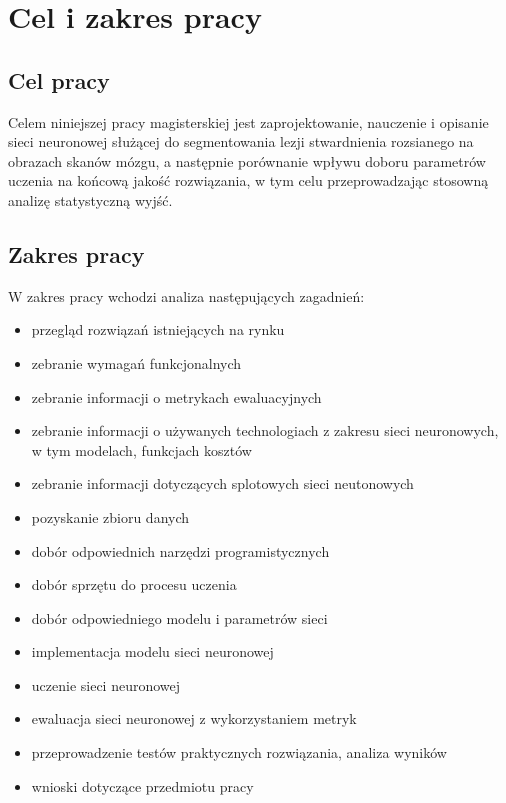 \section{Cel i zakres pracy}
\label{sec:PurposeAndScope}
\subsection{Cel pracy}
\label{sec:Purpose}
\par
Celem niniejszej pracy magisterskiej jest zaprojektowanie, nauczenie i opisanie sieci neuronowej służącej do segmentowania lezji stwardnienia rozsianego na obrazach skanów mózgu, a następnie porównanie wpływu doboru parametrów uczenia na końcową jakość rozwiązania, w tym celu przeprowadzając stosowną analizę statystyczną wyjść.       
\subsection{Zakres pracy}
\label{sec:Scope}
\par
W zakres pracy wchodzi analiza następujących zagadnień:
\begin{itemize}
    \item przegląd rozwiązań istniejących na rynku 
    \item zebranie wymagań funkcjonalnych 
    \item zebranie informacji o metrykach ewaluacyjnych 
    \item zebranie informacji o używanych technologiach z zakresu sieci neuronowych, w tym modelach, funkcjach kosztów 
    \item zebranie informacji dotyczących splotowych sieci neutonowych 
    \item pozyskanie zbioru danych 
    \item dobór odpowiednich narzędzi programistycznych 
    \item dobór sprzętu do procesu uczenia 
    \item dobór odpowiedniego modelu i parametrów sieci 
    \item implementacja modelu sieci neuronowej 
    \item uczenie sieci neuronowej 
    \item ewaluacja sieci neuronowej z wykorzystaniem metryk 
    \item przeprowadzenie testów praktycznych rozwiązania, analiza wyników 
    \item wnioski dotyczące przedmiotu pracy 
\end{itemize}